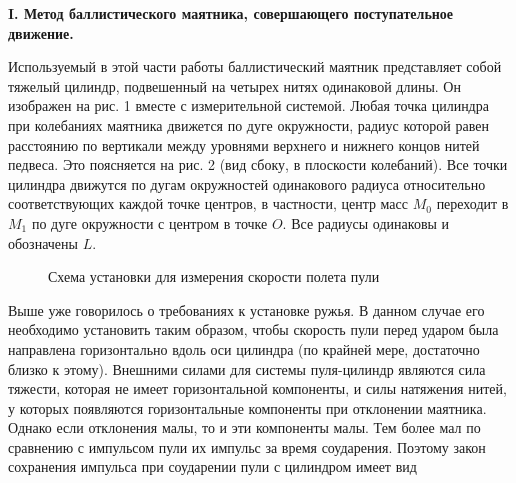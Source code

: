 \documentclass[14pt]{article}
\begin{document}
\newpage
\textbf{I. Метод баллистического маятника, совершающего поступательное движение.}

Используемый в этой части работы баллистический маятник представляет собой тяжелый цилиндр, подвешенный на четырех нитях одинаковой длины. Он изображен на рис. 1 вместе с измерительной системой. Любая точка цилиндра при колебаниях маятника движется по дуге окружности, радиус которой равен расстоянию по вертикали между уровнями верхнего и нижнего концов нитей педвеса. Это поясняется на рис. 2 (вид сбоку, в плоскости колебаний). Все точки цилиндра движутся по дугам окружностей одинакового радиуса относительно соответствующих каждой точке центров, в частности, центр масс $M_0$ переходит в $M_1$ по дуге окружности с центром в точке $O$. Все радиусы одинаковы и обозначены $L$.

\begin{figure}[h!]
	\caption{Схема установки для измерения скорости полета пули}
\end{figure} 

Выше уже говорилось о требованиях к установке ружья. В данном случае его необходимо установить таким образом, чтобы скорость пули перед ударом была направлена горизонтально вдоль оси цилиндра (по крайней мере, достаточно близко к этому). Внешними силами для системы пуля-цилиндр являются сила тяжести, которая не имеет горизонтальной компоненты, и силы натяжения нитей, у которых появляются горизонтальные компоненты при отклонении маятника. Однако если отклонения малы, то и эти компоненты малы. Тем более мал по сравнению с импульсом пули их импульс за время соударения. Поэтому закон сохранения импульса при соударении пули с цилиндром имеет вид
\end{document}
